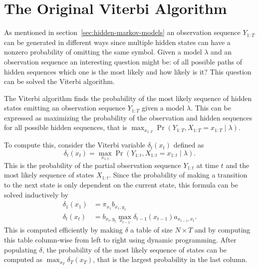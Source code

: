\section{The Original Viterbi Algorithm}
\label{sec:class-viterbi-algor}

As mentioned in section~\ref{sec:hidden-markov-models} an observation sequence
$Y_{1:T}$ can be generated in different ways since multiple hidden states can
have a nonzero probability of omitting the same symbol. Given a model $\lambda$
and an observation sequence an interesting question might be: of all possible
paths of hidden sequences which one is the most likely and how likely is it?
This question can be solved the Viterbi algorithm.

The Viterbi algorithm finds the probability of the most likely sequence of
hidden states emitting an observation sequence $Y_{1:T}$ given a model
$\lambda$. This can be expressed as maximizing the probability of the
observation and hidden sequences for all possible hidden sequences, that is
$\max_{x_{1:T}} \Pr(Y_{1:T}, X_{1:T} = x_{1:T} \mid \lambda)$.

To compute this, consider the Viterbi variable $\delta_t(x_t)$ defined as
\begin{equation*}
  \delta_t(x_t) = \max_{x_{1:t}} \Pr(Y_{1:t}, X_{1:t} = x_{1:t} \mid \lambda).
\end{equation*}
This is the probability of the partial observation sequence $Y_{1:t}$ at time
$t$ and the most likely sequence of states $X_{1:t}$. Since
the probability of making a transition to the next state is only dependent on
the current state, this formula can be solved inductively by
\begin{equation}
  \label{eq:1}
  \begin{aligned}
    \delta_1(x_1) &= \pi_{x_1} b_{x_1, y_1} \\
    \delta_t(x_t) &= b_{x_t, y_t} \max_{x_{t - 1}} \delta_{t - 1}(x_{t - 1}) a_{x_{t - 1}, x_t}.
  \end{aligned}
\end{equation}
This is computed efficiently by making $\delta$ a table of size
$N \times T$ and by computing this table column-wise from left to right
using dynamic programming. After populating $\delta$,
the probability of the most likely sequence of states can be computed as
$\max_{x_T} \delta_T(x_T)$, that is the largest probability in the last
column.

